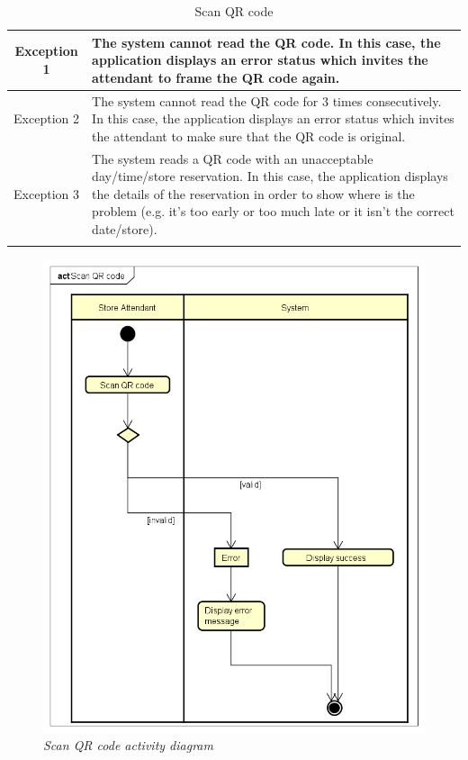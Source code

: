 \documentclass[table, 12pt]{article}
\begin{document}
\begin{longtable}{|c| p{10cm}|}
    \\
    \hline
    \hline
    Exception 1      & The system cannot read the QR code. In this case, the application displays an error status which invites the attendant to frame the QR code again.                                                                                                                 \\
    \hline
    Exception 2      & The system cannot read the QR code for 3 times consecutively. In this case, the application displays an error status which invites the attendant to make sure that the QR code is original.                                                                        \\
    \hline
    Exception 3      & The system reads a QR code with an unacceptable day/time/store reservation. In this case, the application displays the details of the reservation in order to show where is the problem (e.g. it's too early or too much late or it isn't the correct date/store). \\
    \hline
    \caption{Scan QR code}                                                                                                                                                                                                                                                                \\
\end{longtable}



\begin{figure}[H]
    \centering
    \includegraphics[scale=0.4]{assets/Activity-Diagrams/act_scan.png}
    \caption{\textit{Scan QR code activity diagram}}
\end{figure}
\end{document}
